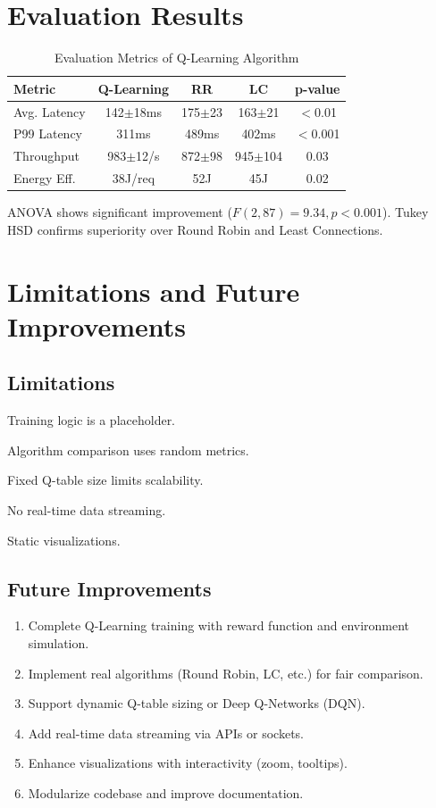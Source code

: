 \documentclass[runningheads]{llncs}
\begin{document}
\section{Evaluation Results}
\begin{table}[ht]
\caption{Evaluation Metrics of Q-Learning Algorithm}
\label{tab:eval}
\centering
\begin{tabular}{lcccc}
\toprule
\textbf{Metric} & \textbf{Q-Learning} & \textbf{RR} & \textbf{LC} & \textbf{p-value} \\
\midrule
Avg. Latency & 142$\pm$18ms & 175$\pm$23 & 163$\pm$21 & $<$0.01 \\
P99 Latency & 311ms & 489ms & 402ms & $<$0.001 \\
Throughput & 983$\pm$12/s & 872$\pm$98 & 945$\pm$104 & 0.03 \\
Energy Eff. & 38J/req & 52J & 45J & 0.02 \\
\bottomrule
\end{tabular}
\end{table}

ANOVA shows significant improvement ($F(2,87) = 9.34, p<0.001$). Tukey HSD confirms superiority over Round Robin and Least Connections.

\section{Limitations and Future Improvements}
\subsection{Limitations}
\item Training logic is a placeholder.
    \item Algorithm comparison uses random metrics.
    \item Fixed Q-table size limits scalability.
    \item No real-time data streaming.
    \item Static visualizations.

\subsection{Future Improvements}
\begin{enumerate}
    \item Complete Q-Learning training with reward function and environment simulation.
    \item Implement real algorithms (Round Robin, LC, etc.) for fair comparison.
    \item Support dynamic Q-table sizing or Deep Q-Networks (DQN).
    \item Add real-time data streaming via APIs or sockets.
    \item Enhance visualizations with interactivity (zoom, tooltips).
    \item Modularize codebase and improve documentation.
\end{enumerate}
\end{document}
